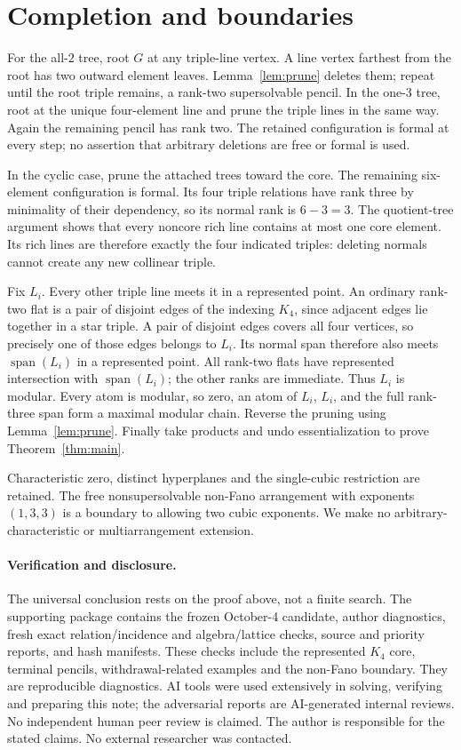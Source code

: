 \documentclass[11pt]{article}
\newcommand{\spanof}{\operatorname{span}}
\begin{document}
\section{Completion and boundaries}
For the all-$2$ tree, root $G$ at any triple-line vertex. A line vertex farthest from the root has two outward element leaves. Lemma~\ref{lem:prune} deletes them; repeat until the root triple remains, a rank-two supersolvable pencil. In the one-$3$ tree, root at the unique four-element line and prune the triple lines in the same way. Again the remaining pencil has rank two. The retained configuration is formal at every step; no assertion that arbitrary deletions are free or formal is used.

In the cyclic case, prune the attached trees toward the core. The remaining six-element configuration is formal. Its four triple relations have rank three by minimality of their dependency, so its normal rank is $6-3=3$. The quotient-tree argument shows that every noncore rich line contains at most one core element. Its rich lines are therefore exactly the four indicated triples: deleting normals cannot create any new collinear triple.

Fix $L_i$. Every other triple line meets it in a represented point. An ordinary rank-two flat is a pair of disjoint edges of the indexing $K_4$, since adjacent edges lie together in a star triple. A pair of disjoint edges covers all four vertices, so precisely one of those edges belongs to $L_i$. Its normal span therefore also meets $\spanof(L_i)$ in a represented point. All rank-two flats have represented intersection with $\spanof(L_i)$; the other ranks are immediate. Thus $L_i$ is modular. Every atom is modular, so zero, an atom of $L_i$, $L_i$, and the full rank-three span form a maximal modular chain. Reverse the pruning using Lemma~\ref{lem:prune}. Finally take products and undo essentialization to prove Theorem~\ref{thm:main}.

Characteristic zero, distinct hyperplanes and the single-cubic restriction are retained. The free nonsupersolvable non-Fano arrangement with exponents $(1,3,3)$ is a boundary to allowing two cubic exponents. We make no arbitrary-characteristic or multiarrangement extension.

\paragraph{Verification and disclosure.}
The universal conclusion rests on the proof above, not a finite search. The supporting package contains the frozen October-4 candidate, author diagnostics, fresh exact relation/incidence and algebra/lattice checks, source and priority reports, and hash manifests. These checks include the represented $K_4$ core, terminal pencils, withdrawal-related examples and the non-Fano boundary. They are reproducible diagnostics. AI tools were used extensively in solving, verifying and preparing this note; the adversarial reports are AI-generated internal reviews. No independent human peer review is claimed. The author is responsible for the stated claims. No external researcher was contacted.
\end{document}
